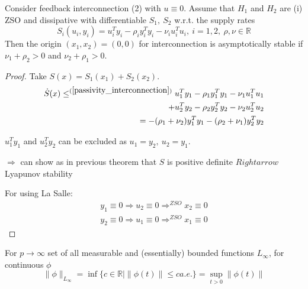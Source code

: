 \begin{Theorem}
Consider feedback interconnection (2) with $u \equiv 0$. Assume that $H_1$ and $H_2$ are (i) ZSO and dissipative with differentiable $S_1, \ S_2$ w.r.t. the supply rates
\begin{equation}\label{passivity_interconnection}
S_i(u_i,y_i) = u_i^Ty_i - \rho_iy_i^Ty_i - \nu_iu_i^Tu_i, \ i=1,2, \ \rho,\nu \in \mathbb{R}
\end{equation}
Then the origin $(x_1,x_2) = (0,0)$ for interconnection is asymptotically stable if $\nu_1 + \rho_2 > 0$ and $\nu_2 + \rho_1 > 0$.
\begin{proof}
Take $S(x) = S_1(x_1)+S_2(x_2)$.
\begin{equation*}
\begin{split}
\dot{S}(x) \leq^{(\ref{passivity_interconnection})} u_1^Ty_1 - \rho_1 y_1^Ty_1 - \nu_1u_1^Tu_1 \\
+ u_2^Ty_2 - \rho_2y_2^Ty_2 - \nu_2u_2^Tu_2 \\
= - (\rho_1 + \nu_2)y_1^Ty_1 - (\rho_2 +\nu_1)y_2^Ty_2
\end{split}
\end{equation*}

$u_1^Ty_1$ and $u_2^Ty_2$ can be excluded as $u_1=y_2, \ u_2 = y_1$. 

$\Rightarrow$ can show as in previous theorem that $S$ is positive definite $Rightarrow$ Lyapunov stability

For using La Salle:
\begin{equation*}
\begin{split}
y_1 \equiv 0 \Rightarrow u_2 \equiv 0 \Rightarrow^{ZSO} x_2 \equiv 0 \\
y_2 \equiv 0 \Rightarrow u_1 \equiv 0 \Rightarrow^{ZSO} x_1 \equiv 0
\end{split}
\end{equation*}
\end{proof}
\end{Theorem}


For $p \to \infty$ set of all measurable and (essentially) bounded functions $L_{\infty}$, for continuous $\phi$ 
\begin{equation*}
\|\phi\|_{L_{\infty}} = \inf \{ c \in \mathbb{R} | \|\phi(t)\| \leq c a.e.\} = \sup_{t > 0} \| \phi(t)\|
\end{equation*}

